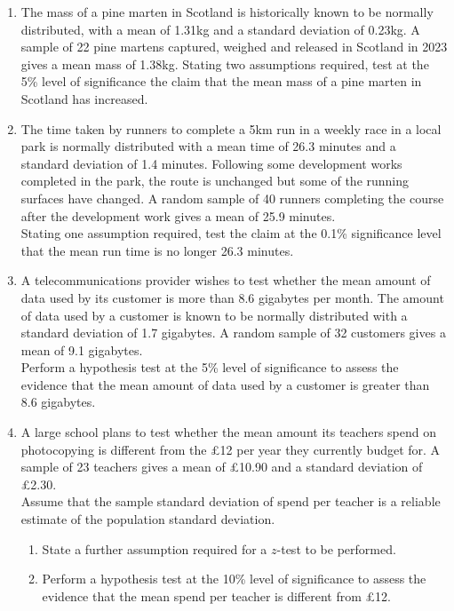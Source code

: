 \documentclass[
  11pt,
]{book}
\begin{document}
\begin{enumerate}[resume]
    \item The mass of a pine marten in Scotland is historically known to be normally distributed, with a mean of 1.31kg and a standard deviation of 0.23kg. A sample of 22 pine martens captured, weighed and released in Scotland in 2023 gives a mean mass of 1.38kg. Stating two assumptions required, test at the 5\% level of significance the claim that the mean mass of a pine marten in Scotland has increased.
    \item The time taken by runners to complete a 5km run in a weekly race in a local park is normally distributed with a mean time of 26.3 minutes and a standard deviation of 1.4 minutes. Following some development works completed in the park, the route is unchanged but some of the running surfaces have changed. A random sample of 40 runners completing the course after the development work gives a mean of 25.9 minutes.\\[0.5em] Stating one assumption required, test the claim at the 0.1\% significance level that the mean run time is no longer 26.3 minutes.
    \item A telecommunications provider wishes to test whether the mean amount of data used by its customer is more than 8.6 gigabytes per month. The amount of data used by a customer is known to be normally distributed with a standard deviation of 1.7 gigabytes. A random sample of 32 customers gives a mean of 9.1 gigabytes.\\[0.5em] Perform a hypothesis test at the 5\% level of significance to assess the evidence that the mean amount of data used by a customer is greater than 8.6 gigabytes.
    \item A large school plans to test whether the mean amount its teachers spend on photocopying is different from the £12 per year they currently budget for. A sample of 23 teachers gives a mean of £10.90 and a standard deviation of £2.30.\\[0.5em] 
    Assume that the sample standard deviation of spend per teacher is a reliable estimate of the population standard deviation.
    \begin{enumerate}
        \item State a further assumption required for a $z$-test to be performed.
        \item Perform a hypothesis test at the 10\% level of significance to assess the evidence that the mean spend per teacher is different from £12.
    \end{enumerate}

\end{enumerate}
\end{document}
